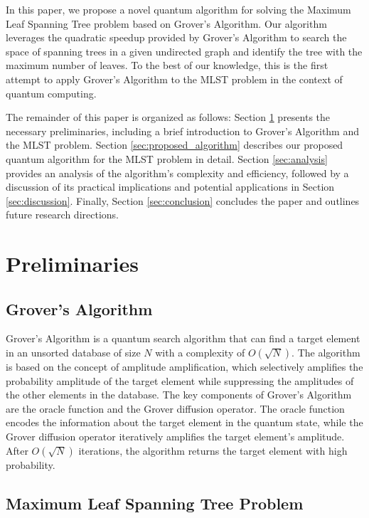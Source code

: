 In this paper, we propose a novel quantum algorithm for solving the Maximum Leaf Spanning Tree problem based on Grover's Algorithm. Our algorithm leverages the quadratic speedup provided by Grover's Algorithm to search the space of spanning trees in a given undirected graph and identify the tree with the maximum number of leaves. To the best of our knowledge, this is the first attempt to apply Grover's Algorithm to the MLST problem in the context of quantum computing.

The remainder of this paper is organized as follows: Section \ref{sec:preliminaries} presents the necessary preliminaries, including a brief introduction to Grover's Algorithm and the MLST problem. Section \ref{sec:proposed_algorithm} describes our proposed quantum algorithm for the MLST problem in detail. Section \ref{sec:analysis} provides an analysis of the algorithm's complexity and efficiency, followed by a discussion of its practical implications and potential applications in Section \ref{sec:discussion}. Finally, Section \ref{sec:conclusion} concludes the paper and outlines future research directions.

\section{Preliminaries}\label{sec:preliminaries}

\subsection{Grover's Algorithm}

Grover's Algorithm is a quantum search algorithm that can find a target element in an unsorted database of size $N$ with a complexity of $O(\sqrt{N})$. The algorithm is based on the concept of amplitude amplification, which selectively amplifies the probability amplitude of the target element while suppressing the amplitudes of the other elements in the database. The key components of Grover's Algorithm are the oracle function and the Grover diffusion operator. The oracle function encodes the information about the target element in the quantum state, while the Grover diffusion operator iteratively amplifies the target element's amplitude. After $O(\sqrt{N})$ iterations, the algorithm returns the target element with high probability.

\subsection{Maximum Leaf Spanning Tree Problem}

